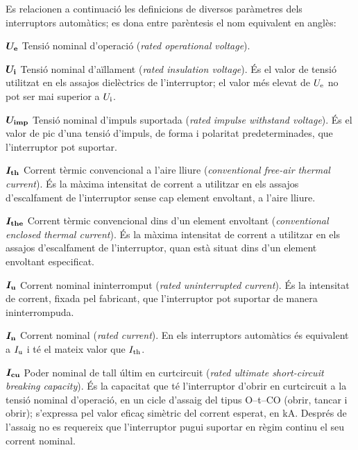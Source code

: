 Es relacionen a continuació les definicions de diversos paràmetres dels interruptors automàtics; es dona entre parèntesis el nom equivalent en anglès:
\begin{list}{}
   {\setlength{\labelwidth}{10mm} \setlength{\leftmargin}{10mm} \setlength{\labelsep}{2mm}}
   \item[$\boldsymbol{U_\mathrm{e}}$] Tensió nominal d'operació (\textit{rated operational voltage}).
   \item[$\boldsymbol{U_\mathrm{i}}$] Tensió nominal d'aïllament (\textit{rated insulation voltage}). És el valor de tensió utilitzat en els assajos dielèctrics de l'interruptor;  el valor més elevat de $U_\mathrm{e}$ no pot ser mai superior a $U_\mathrm{i}$.
    \item[$\boldsymbol{U_\mathrm{imp}}$] Tensió nominal d'impuls suportada (\textit{rated impulse withstand voltage}). És el valor de pic d'una tensió d'impuls, de forma i polaritat predeterminades, que l'interruptor pot suportar.
   \item[$\boldsymbol{I_\mathrm{th}}$] Corrent tèrmic convencional a l'aire lliure (\textit{conventional free-air thermal current}).  És la  màxima intensitat de corrent a utilitzar en els assajos d'escalfament de l'interruptor sense cap element envoltant, a l'aire lliure.
   \item[$\boldsymbol{I_\mathrm{the}}$] Corrent tèrmic convencional dins d'un element envoltant (\textit{conventional enclosed thermal current}).  És la màxima intensitat de corrent a utilitzar en els assajos d'escalfament de l'interruptor, quan està situat dins d'un element envoltant especificat.
    \item[$\boldsymbol{I_\mathrm{u}}$] Corrent nominal ininterromput (\textit{rated uninterrupted current}).  És la intensitat  de corrent, fixada pel fabricant, que l'interruptor pot suportar de manera ininterrompuda.
    \item[$\boldsymbol{I_\mathrm{n}}$] Corrent nominal (\textit{rated current}).  En els interruptors automàtics és equivalent a $I_\mathrm{u}$ i té el mateix valor que $I_\mathrm{th}$.
    \item[$\boldsymbol{I_\mathrm{cu}}$] Poder nominal de tall últim en curtcircuit (\textit{rated ultimate  short-circuit breaking capacity}). És la capacitat que té l'interruptor d'obrir en curtcircuit a la tensió nominal d'operació, en un cicle d'assaig del tipus O--t--CO (obrir, tancar i obrir); s'expressa pel valor eficaç simètric del corrent esperat, en kA. Després de l'assaig no es requereix que l'interruptor pugui suportar en règim continu el seu corrent nominal.

\end{list}
